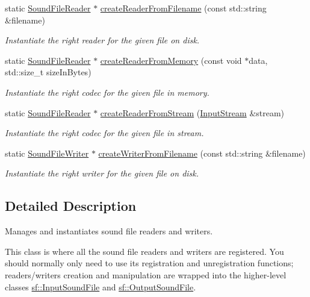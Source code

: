 \begin{DoxyCompactItemize}
static \hyperlink{classsf_1_1_sound_file_reader}{Sound\+File\+Reader} $\ast$ \hyperlink{classsf_1_1_sound_file_factory_af0a87110e0b8a77aada17b22a016c066}{create\+Reader\+From\+Filename} (const std\+::string \&filename)
\begin{DoxyCompactList}\small\item\em Instantiate the right reader for the given file on disk. \end{DoxyCompactList}\item 
static \hyperlink{classsf_1_1_sound_file_reader}{Sound\+File\+Reader} $\ast$ \hyperlink{classsf_1_1_sound_file_factory_aee7a0ff1eace98d5325eaadc7d26d50c}{create\+Reader\+From\+Memory} (const void $\ast$data, std\+::size\+\_\+t size\+In\+Bytes)
\begin{DoxyCompactList}\small\item\em Instantiate the right codec for the given file in memory. \end{DoxyCompactList}\item 
static \hyperlink{classsf_1_1_sound_file_reader}{Sound\+File\+Reader} $\ast$ \hyperlink{classsf_1_1_sound_file_factory_a8d4b1f225b72a128ddba3be22f7ba5a2}{create\+Reader\+From\+Stream} (\hyperlink{classsf_1_1_input_stream}{Input\+Stream} \&stream)
\begin{DoxyCompactList}\small\item\em Instantiate the right codec for the given file in stream. \end{DoxyCompactList}\item 
static \hyperlink{classsf_1_1_sound_file_writer}{Sound\+File\+Writer} $\ast$ \hyperlink{classsf_1_1_sound_file_factory_a0702eb2e8a4a171ba80c7fbd04c4defc}{create\+Writer\+From\+Filename} (const std\+::string \&filename)
\begin{DoxyCompactList}\small\item\em Instantiate the right writer for the given file on disk. \end{DoxyCompactList}\end{DoxyCompactItemize}


\subsection{Detailed Description}
Manages and instantiates sound file readers and writers. 

This class is where all the sound file readers and writers are registered. You should normally only need to use its registration and unregistration functions; readers/writers creation and manipulation are wrapped into the higher-\/level classes \hyperlink{classsf_1_1_input_sound_file}{sf\+::\+Input\+Sound\+File} and \hyperlink{classsf_1_1_output_sound_file}{sf\+::\+Output\+Sound\+File}.

